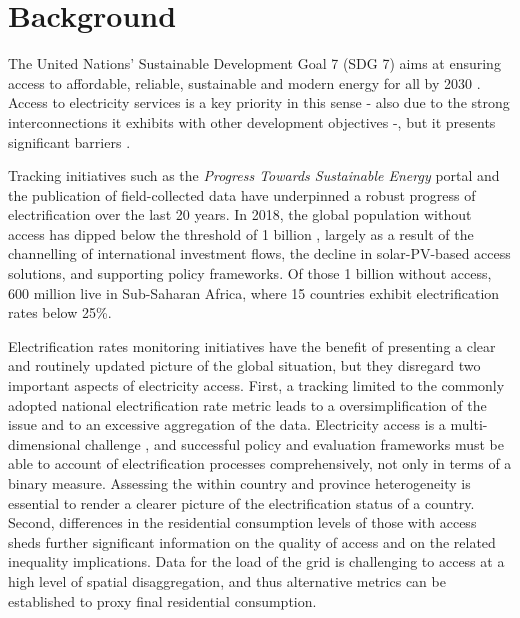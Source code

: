 \documentclass[preprint,12pt]{elsarticle}
\begin{document}
\section{Background}
The United Nations' Sustainable Development Goal 7 (SDG 7) aims at ensuring access to affordable, reliable, sustainable and modern energy for all by 2030 \citep{un2018_sustdevgoals}. Access to electricity services is a key priority in this sense - also due to the strong interconnections it exhibits with other development objectives \citep{nerini2018mapping} -, but it presents significant barriers \citep{bonan_access_2017}.

Tracking initiatives such as the \textit{Progress Towards Sustainable Energy} portal \citep{banerjee2013global} and the publication of field-collected data \citep{aklin_global_2018, macro2009measure} have underpinned a robust progress of electrification over the last 20 years. In 2018, the global population without access has dipped below the threshold of 1 billion \citep{iea_world_2018}, largely as a result of the channelling of international investment flows, the decline in solar-PV-based access solutions, and supporting policy frameworks. Of those 1 billion without access, 600 million live in Sub-Saharan Africa, where 15 countries exhibit electrification rates below 25\%. 

Electrification rates monitoring initiatives have the benefit of presenting a clear and routinely updated picture of the global situation, but they disregard two important aspects of electricity access. First, a tracking limited to the commonly adopted national electrification rate metric leads to a oversimplification of the issue and to an excessive aggregation of the data. Electricity access is a multi-dimensional challenge \citep{riva_merry-go-round_2018}, and successful policy and evaluation frameworks must be able to account of electrification processes comprehensively, not only in terms of a binary measure. Assessing the within country and province heterogeneity is essential to render a clearer picture of the electrification status of a country. Second, differences in the residential consumption levels of those with access sheds further significant information on the quality of access and on the related inequality implications. Data for the load of the grid is challenging to access at a high level of spatial disaggregation, and thus alternative metrics can be established to proxy final residential consumption.
\end{document}
